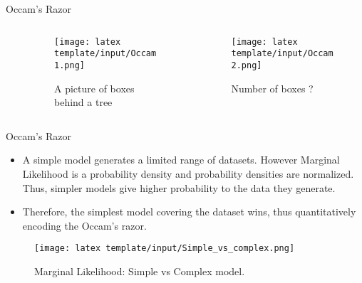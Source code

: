 \documentclass[t, aspectratio=169]{beamer}
\begin{document}

\begin{frame}{Occam's Razor}
 \begin{columns}[b]\

\begin{column}{0.6\textwidth}
 \begin{figure}
 \texttt{[image: latex template/input/Occam1.png]}
  \caption{A picture of boxes behind a tree \cite{Mackay}}
    \end{figure}
\end{column}

   \begin{column}{.4\textwidth}
     \begin{figure}
    \centering
        \texttt{[image: latex template/input/Occam2.png]}
         \caption{Number of boxes ? \cite{Mackay}}
    \end{figure}
   \end{column}
 \end{columns}
 \end{frame} 
  
 \begin{frame}{Occam's Razor}
 \vspace{0.5cm}
 \begin{itemize}
     \item A simple model generates a limited range of datasets. However Marginal Likelihood is a probability density and probability densities are normalized. Thus, simpler models give higher probability to the data they generate.
\item Therefore, the simplest model covering the dataset wins, thus quantitatively encoding the Occam’s razor.

 \end{itemize}
  \vspace{0.1cm}
 \begin{figure}
 \texttt{[image: latex template/input/Simple\_vs\_complex.png]}
 \caption{Marginal Likelihood: Simple vs Complex model. \cite{DavidMackay}}
 
 \end{figure}
 \end{frame}  
 
\end{document}
